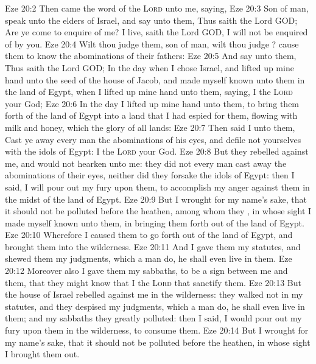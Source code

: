 \vs Eze 20:2 Then came the word of the \textsc{Lord} unto me, saying,
\vs Eze 20:3 Son of man, speak unto the elders of Israel, and say unto them, Thus saith the Lord GOD; Are ye come to enquire of me?  I live, saith the Lord GOD, I will not be enquired of by you.
\vs Eze 20:4 Wilt thou judge them, son of man, wilt thou judge ? cause them to know the abominations of their fathers:
\vs Eze 20:5 And say unto them, Thus saith the Lord GOD; In the day when I chose Israel, and lifted up mine hand unto the seed of the house of Jacob, and made myself known unto them in the land of Egypt, when I lifted up mine hand unto them, saying, I  the \textsc{Lord} your God;
\vs Eze 20:6 In the day  I lifted up mine hand unto them, to bring them forth of the land of Egypt into a land that I had espied for them, flowing with milk and honey, which  the glory of all lands:
\vs Eze 20:7 Then said I unto them, Cast ye away every man the abominations of his eyes, and defile not yourselves with the idols of Egypt: I  the \textsc{Lord} your God.
\vs Eze 20:8 But they rebelled against me, and would not hearken unto me: they did not every man cast away the abominations of their eyes, neither did they forsake the idols of Egypt: then I said, I will pour out my fury upon them, to accomplish my anger against them in the midst of the land of Egypt.
\vs Eze 20:9 But I wrought for my name's sake, that it should not be polluted before the heathen, among whom they , in whose sight I made myself known unto them, in bringing them forth out of the land of Egypt.
\vs Eze 20:10 Wherefore I caused them to go forth out of the land of Egypt, and brought them into the wilderness.
\vs Eze 20:11 And I gave them my statutes, and shewed them my judgments, which  a man do, he shall even live in them.
\vs Eze 20:12 Moreover also I gave them my sabbaths, to be a sign between me and them, that they might know that I  the \textsc{Lord} that sanctify them.
\vs Eze 20:13 But the house of Israel rebelled against me in the wilderness: they walked not in my statutes, and they despised my judgments, which  a man do, he shall even live in them; and my sabbaths they greatly polluted: then I said, I would pour out my fury upon them in the wilderness, to consume them.
\vs Eze 20:14 But I wrought for my name's sake, that it should not be polluted before the heathen, in whose sight I brought them out.
